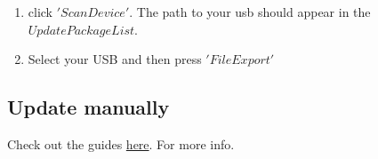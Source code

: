 \documentclass{article}
\begin{document}
\begin{enumerate}
\begin{figure}[H]
\end{figure}
\item click $'Scan Device'$. The path to your usb should appear in the $Update Package List$. 
\item Select your USB and then press $'File Export'$
\end{enumerate}


\subsection{Update manually}
Check out the guides \href{https://drive.google.com/drive/folders/1e2sAyCd5S1s4jH7FRyMwZzTy7VTZb2NE}{here}. For more info. 
 
\end{document}
